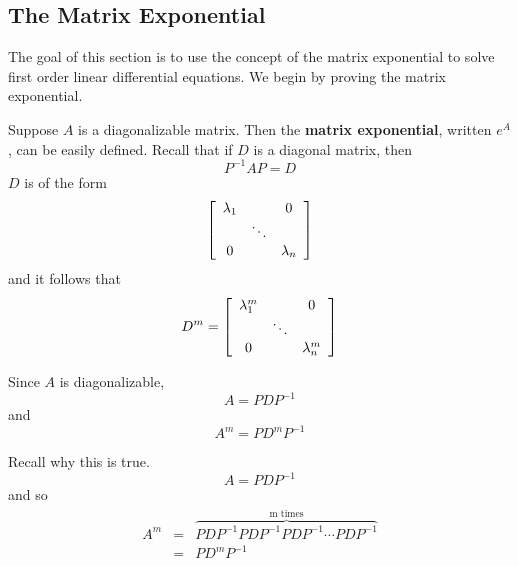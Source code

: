 
\subsection{The Matrix Exponential}

The goal of this section is to use the concept of the matrix exponential to solve first order linear differential equations. We begin by proving the matrix exponential. 

Suppose $A$ is a diagonalizable matrix. Then the {\bf matrix exponential}, written $e^{A}$, can be easily defined. 
Recall that if $D$ is a diagonal matrix, then  
\begin{equation*}
P^{-1}AP=D
\end{equation*}
$D$ is of the form 
\begin{equation}
\left[ 
\begin{array}{ccc}
\lambda _{1} &  & 0 \\ 
& \ddots &  \\ 
0 &  & \lambda _{n}
\end{array}
\right]  \label{diagonalmatrix}
\end{equation}
and it follows that 
\begin{equation*}
D^{m}=\left[ 
\begin{array}{ccc}
\lambda _{1}^{m} &  & 0 \\ 
& \ddots &  \\ 
0 &  & \lambda _{n}^{m}
\end{array}
\right]
\end{equation*}

Since $A$ is diagonalizable, 
\begin{equation*}
A=PDP^{-1}
\end{equation*}
and
\begin{equation*}
A^{m}=PD^{m}P^{-1}
\end{equation*}

Recall why this is true. 
\begin{equation*}
A=PDP^{-1}
\end{equation*}
and so 
\begin{eqnarray*}
A^{m} &=&\overset{
\text{m times}}{\overbrace{PDP^{-1}PDP^{-1}PDP^{-1}\cdots PDP^{-1}}} \\
&=&PD^{m}P^{-1}
\end{eqnarray*}

